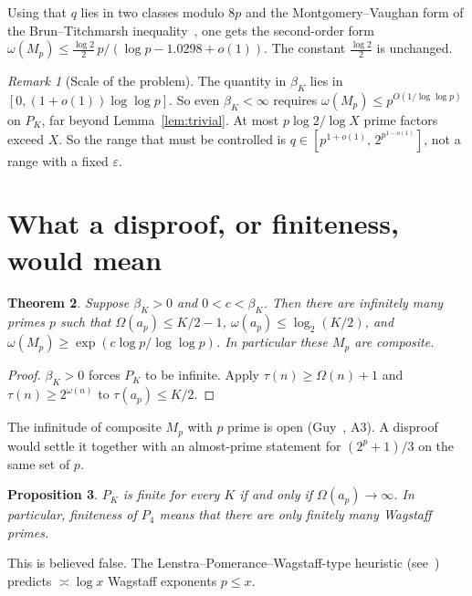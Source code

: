 \documentclass[11pt]{amsart}
\newtheorem{theorem}{Theorem}[section]
\newtheorem{proposition}[theorem]{Proposition}
\theoremstyle{definition}
\theoremstyle{remark}
\newtheorem{remark}[theorem]{Remark}
\begin{document}
Using that $q$ lies in two classes modulo $8p$ and the Montgomery--Vaughan form of the Brun--Titchmarsh
inequality~\cite{MV73}, one gets the second-order form $\omega(M_p)\le\frac{\log2}2\,p/(\log p-1.0298+o(1))$.
The constant $\frac{\log2}{2}$ is unchanged.

\begin{remark}[Scale of the problem]
The quantity in $\beta_K$ lies in $[0,(1+o(1))\log\log p]$. So even $\beta_K<\infty$ requires
$\omega(M_p)\le p^{O(1/\log\log p)}$ on $P_K$, far beyond Lemma~\ref{lem:trivial}. At most
$p\log2/\log X$ prime factors exceed $X$. So the range that must be controlled is
$q\in[p^{1+o(1)},\,2^{p^{1-o(1)}}]$, not a range with a fixed $\varepsilon$.
\end{remark}

\section{What a disproof, or finiteness, would mean}

\begin{theorem}\label{thm:disproof}
Suppose $\beta_K>0$ and $0<c<\beta_K$. Then there are infinitely many primes $p$ such that
$\Omega(a_p)\le K/2-1$, $\omega(a_p)\le\log_2(K/2)$, and $\omega(M_p)\ge\exp(c\log p/\log\log p)$. In particular
these $M_p$ are composite.
\end{theorem}
\begin{proof}
$\beta_K>0$ forces $P_K$ to be infinite. Apply $\tau(n)\ge\Omega(n)+1$ and $\tau(n)\ge2^{\omega(n)}$ to
$\tau(a_p)\le K/2$.
\end{proof}

The infinitude of composite $M_p$ with $p$ prime is open (Guy~\cite{Guy}, A3). A disproof would settle it together
with an almost-prime statement for $(2^p+1)/3$ on the same set of $p$.

\begin{proposition}\label{prop:finite}
$P_K$ is finite for every $K$ if and only if $\Omega(a_p)\to\infty$. In particular, finiteness of $P_4$ means that
there are only finitely many Wagstaff primes.
\end{proposition}
This is believed false. The Lenstra--Pomerance--Wagstaff-type heuristic (see~\cite{BSW89}) predicts
$\asymp\log x$ Wagstaff exponents $p\le x$.
\end{document}
